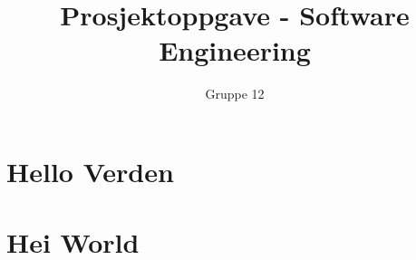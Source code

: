 \documentclass[12pt]{article}%
\begin{document}
\title{Prosjektoppgave - Software Engineering}
\author{Gruppe 12}
\date{}
\maketitle

\newpage

\tableofcontents

\newpage

\section{Hello Verden}

\section{Hei World}
\end{document}
